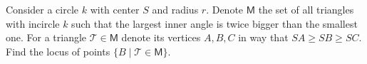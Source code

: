 Consider a circle $k$ with center $S$ and radius $r$. Denote $\mathsf M$ the set of all triangles with incircle $k$ such that the largest inner angle is twice bigger than the smallest one. For a triangle $\mathcal T\in\mathsf M$ denote its vertices $A,B,C$ in way that $SA\ge SB\ge SC$. Find the locus of points $\{B\mid\mathcal T\in\mathsf M\}$.